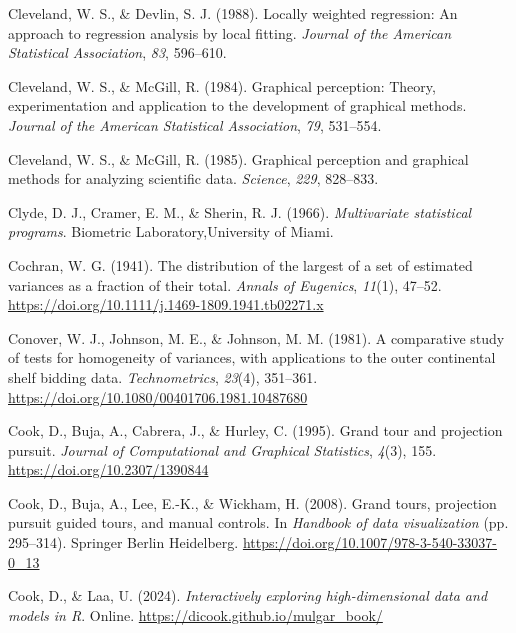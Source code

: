 \documentclass[
  letterpaper,
  10pt,
  krantz2]{krantz}
\newlength{\cslhangindent}
\newenvironment{CSLReferences}[2] %
 {\begin{list}{}{%
  \setlength{\itemindent}{0pt}
  \setlength{\leftmargin}{0pt}
  \setlength{\parsep}{0pt}
  \ifodd #1
   \setlength{\leftmargin}{\cslhangindent}
   \setlength{\itemindent}{-1\cslhangindent}
  \fi
  \setlength{\itemsep}{#2\baselineskip}}}
 {\end{list}}
\begin{document}
\begin{CSLReferences}{1}{0}
Cleveland, W. S., \& Devlin, S. J. (1988). Locally weighted regression:
An approach to regression analysis by local fitting. \emph{Journal of
the American Statistical Association}, \emph{83}, 596--610.

Cleveland, W. S., \& McGill, R. (1984). Graphical perception: Theory,
experimentation and application to the development of graphical methods.
\emph{Journal of the American Statistical Association}, \emph{79},
531--554.

Cleveland, W. S., \& McGill, R. (1985). Graphical perception and
graphical methods for analyzing scientific data. \emph{Science},
\emph{229}, 828--833.

Clyde, D. J., Cramer, E. M., \& Sherin, R. J. (1966). \emph{Multivariate
statistical programs}. Biometric Laboratory,University of Miami.

Cochran, W. G. (1941). The distribution of the largest of a set of
estimated variances as a fraction of their total. \emph{Annals of
Eugenics}, \emph{11}(1), 47--52.
\url{https://doi.org/10.1111/j.1469-1809.1941.tb02271.x}

Conover, W. J., Johnson, M. E., \& Johnson, M. M. (1981). A comparative
study of tests for homogeneity of variances, with applications to the
outer continental shelf bidding data. \emph{Technometrics},
\emph{23}(4), 351--361.
\url{https://doi.org/10.1080/00401706.1981.10487680}

Cook, D., Buja, A., Cabrera, J., \& Hurley, C. (1995). Grand tour and
projection pursuit. \emph{Journal of Computational and Graphical
Statistics}, \emph{4}(3), 155. \url{https://doi.org/10.2307/1390844}

Cook, D., Buja, A., Lee, E.-K., \& Wickham, H. (2008). Grand tours,
projection pursuit guided tours, and manual controls. In \emph{Handbook
of data visualization} (pp. 295--314). Springer Berlin Heidelberg.
\url{https://doi.org/10.1007/978-3-540-33037-0_13}

Cook, D., \& Laa, U. (2024). \emph{Interactively exploring
high-dimensional data and models in {R}}. Online.
\url{https://dicook.github.io/mulgar_book/}


\end{CSLReferences}
\end{document}
